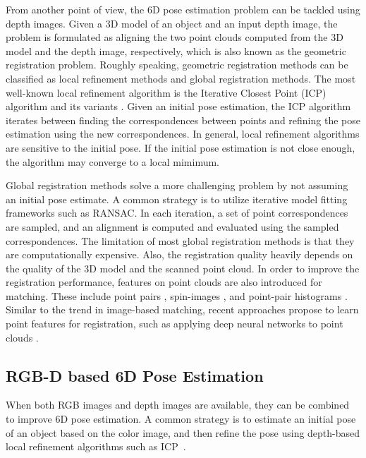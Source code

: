 \documentclass[twocolumn]{svjour3}
\begin{document}
From another point of view, the 6D pose estimation problem can be tackled using depth images. Given a 3D model of an object and an input depth image, the problem is formulated as aligning the two point clouds computed from the 3D model and the depth image, respectively, which is also known as the geometric registration problem. Roughly speaking, geometric registration methods can be classified as local refinement methods and global registration methods. The most well-known local refinement algorithm is the Iterative Closest Point (ICP) algorithm \citep{besl1992method} and its variants \citep{rusinkiewicz2001efficient,salvi2007review,tam2013registration}. Given an initial pose estimation, the ICP algorithm iterates between finding the correspondences between points and refining the pose estimation using the new correspondences. In general, local refinement algorithms are sensitive to the initial pose. If the initial pose estimation is not close enough, the algorithm may converge to a local mimimum.

Global registration methods \citep{mellado2014super,theiler2015globally,zhou2016fast,yang2016go} solve a more challenging problem by not assuming an initial pose estimate. A common strategy is to utilize iterative model fitting frameworks such as RANSAC. In each iteration, a set of point correspondences are sampled, and an alignment is computed and evaluated using the sampled correspondences. The limitation of most global registration methods is that they are computationally expensive. Also, the registration quality heavily depends on the quality of the 3D model and the scanned point cloud. In order to improve the registration performance, features on point clouds are also introduced for matching. These include point pairs \citep{mian2006three,hinterstoisser2016going}, spin-images \citep{johnson1999using}, and point-pair histograms \citep{rusu2009fast,tombari2010unique}. Similar to the trend in image-based matching, recent approaches \citep{wang2019densefusion} propose to learn point features for registration, such as applying deep neural networks to point clouds \citep{qi2017pointnet}.

\subsection{RGB-D based 6D Pose Estimation} 

When both RGB images and depth images are available, they can be combined to improve 6D pose estimation. A common strategy is to estimate an initial pose of an object based on the color image, and then refine the pose using depth-based local refinement algorithms such as ICP~\citep{hinterstoisser2012accv,michel2016global,zeng2017multi}.
\end{document}

